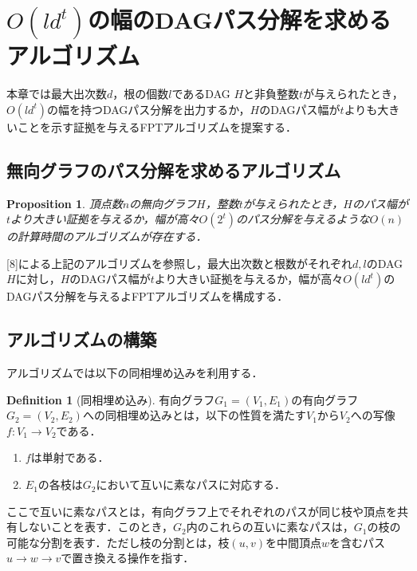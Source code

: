 \documentclass[master]{kuisthesis}		%
\theoremstyle{plain}
\newtheorem{proposition}{Proposition}
\theoremstyle{definition}
\newtheorem{definition*}{Definition}
\begin{document}
\section{$O(ld^t)$の幅のDAGパス分解を求めるアルゴリズム} %

本章では最大出次数$d$，根の個数$l$であるDAG $H$と非負整数$t$が与えられたとき，$O(ld^t)$の幅を持つDAGパス分解を出力するか，$H$のDAGパス幅が$t$よりも大きいことを示す証拠を与えるFPTアルゴリズムを提案する．

\subsection{無向グラフのパス分解を求めるアルゴリズム}

\begin{proposition}\label{pathwidth algorithm of undirected graph}
    頂点数$n$の無向グラフ$H$，整数$t$が与えられたとき，$H$のパス幅が$t$より大きい証拠を与えるか，幅が高々$O(2^t)$のパス分解を与えるような$O(n)$の計算時間のアルゴリズムが存在する．
\end{proposition}

[8]による上記のアルゴリズムを参照し，最大出次数と根数がそれぞれ$d, l$のDAG $H$に対し，$H$のDAGパス幅が$t$より大きい証拠を与えるか，幅が高々$O(ld^t)$のDAGパス分解を与えるよFPTアルゴリズムを構成する．

\subsection{アルゴリズムの構築}

アルゴリズムでは以下の同相埋め込みを利用する．

\begin{definition*}[同相埋め込み]
    有向グラフ$G_1 = (V_1, E_1)$の有向グラフ$G_2 = (V_2, E_2)$への同相埋め込みとは，以下の性質を満たす$V_1$から$V_2$への写像$f:V_1 \rightarrow V_2$である．
    \begin{enumerate}
        \item $f$は単射である．
        \item $E_1$の各枝は$G_2$において互いに素なパスに対応する．
    \end{enumerate}
    ここで互いに素なパスとは，有向グラフ上でそれぞれのパスが同じ枝や頂点を共有しないことを表す．このとき，$G_2$内のこれらの互いに素なパスは，$G_1$の枝の可能な分割を表す．ただし枝の分割とは，枝$(u, v)$を中間頂点$w$を含むパス$u\rightarrow w \rightarrow v$で置き換える操作を指す．
\end{definition*}
\end{document}
